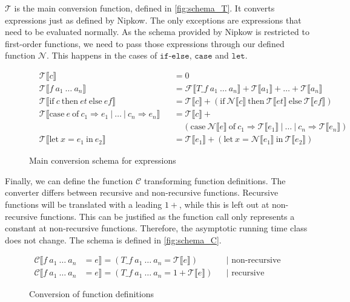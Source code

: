 $\mathcal{T}$ is the main conversion function, defined in \autoref{fig:schema_T}.
It converts expressions just as defined by Nipkow.
The only exceptions are expressions that need to be evaluated normally.
As the schema provided by Nipkow is restricted to first-order functions, we need to pass those expressions through our defined function $\mathcal{N}$.
This happens in the cases of $\texttt{if-else}$, $\texttt{case}$ and $\texttt{let}$.
\begin{figure}
\begin{align*}
  &\mathcal{T}\llbracket c\rrbracket &&= 0\\
  &\mathcal{T}\llbracket f\ a_{1}\ \dots\ a_{n}\rrbracket &&= \mathcal{F}\llbracket T\_f\ a_{1}\ \dots\ a_{n}\rrbracket + \mathcal{T}\llbracket a_{1}\rrbracket + \dots + \mathcal{T}\llbracket a_{n}\rrbracket\\
  &\mathcal{T}\llbracket \text{if}\ c\ \text{then}\ et\ \text{else}\ ef\rrbracket &&= \mathcal{T}\llbracket c\rrbracket + (\text{if}\ \mathcal{N}\llbracket c\rrbracket\ \text{then}\ \mathcal{T}\llbracket et\rrbracket\ \text{else}\ \mathcal{T}\llbracket ef\rrbracket)\\
  &\mathcal{T}\llbracket \text{case}\ e\ \text{of}\ c_{1} \Rightarrow e_{1}\ |\ \dots\ |\ c_{n}\Rightarrow e_{n}\rrbracket &&= \mathcal{T}\llbracket c\rrbracket + \\
  & &&\ \ \ \ \ (\text{case}\ \mathcal{N}\llbracket e\rrbracket\ \text{of}\ c_{1}\Rightarrow\mathcal{T}\llbracket e_{1}\rrbracket\ |\ \dots\ |\ c_{n} \Rightarrow \mathcal{T}\llbracket e_{n}\rrbracket)\\
  &\mathcal{T}\llbracket \text{let}\ x = e_{1}\ \text{in}\ e_{2}\rrbracket &&= \mathcal{T}\llbracket e_{1}\rrbracket + (\text{let}\ x = \mathcal{N}\llbracket e_{1}\rrbracket\ \text{in}\ \mathcal{T}\llbracket e_{2}\rrbracket)
\end{align*}
  \caption{Main conversion schema for expressions}
  \label{fig:schema_T}
\end{figure}

Finally, we can define the function $\mathcal{C}$ transforming function definitions.
The converter differs between recursive and non-recursive functions.
Recursive functions will be translated with a leading $1+$, while this is left out at non-recursive functions.
This can be justified as the function call only represents a constant at non-recursive functions.
Therefore, the asymptotic running time class does not change.
The schema is defined in \autoref{fig:schema_C}.

\begin{figure}
  \begin{align*}
    \mathcal{C}\llbracket f\ a_1\ \dots\ a_n &= e\rrbracket = (T\_f\ a_{1}\ \dots\ a_{n} = \mathcal{T}\llbracket e\rrbracket) &&\text{| non-recursive}\\
    \mathcal{C}\llbracket f\ a_1\ \dots\ a_n &= e\rrbracket = (T\_f\ a_{1}\ \dots\ a_{n} = 1 + \mathcal{T}\llbracket e\rrbracket) &&\text{| recursive}
  \end{align*}
  \caption{Conversion of function definitions}
  \label{fig:schema_C}
\end{figure}
